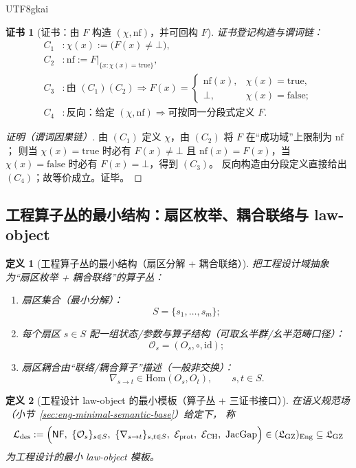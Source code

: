 \documentclass[12pt]{article}
\newtheorem{definition}{定义}[section]
\newtheorem{Certificate}{证书}[section]
\newcommand{\GZLS}{\ensuremath{\mathfrak{L}_{\mathrm{GZ}}}}
\newcommand{\JacGap}{\ensuremath{\mathrm{JacGap}}} %
\begin{document}
\begin{CJK*}{UTF8}{gkai}
\begin{Certificate}[证书：由 $F$ 构造 $(\chi,\mathrm{nf})$，并可回构 $F$]
\label{cert:eng-minimal-f-equivalence}
证书登记构造与谓词链：
\[
\begin{aligned}
  C_1 &: \chi(x):=\bigl(F(x)\neq\bot\bigr),\\
  C_2 &: \mathrm{nf}:=\left.F\right|_{\{x:\chi(x)=\mathrm{true}\}},\\
  C_3 &: \text{由 }(C_1)(C_2)\Rightarrow
  F(x)=\begin{cases}\mathrm{nf}(x),&\chi(x)=\mathrm{true},\\ \bot,&\chi(x)=\mathrm{false};\end{cases}\\
  C_4 &: \text{反向：给定 }(\chi,\mathrm{nf})\Rightarrow \text{可按同一分段式定义 }F.
\end{aligned}
\]
\end{Certificate}

\begin{proof}[证明（谓词因果链）]
由 $(C_1)$ 定义 $\chi$，由 $(C_2)$ 将 $F$ 在“成功域”上限制为 $\mathrm{nf}$；
则当 $\chi(x)=\mathrm{true}$ 时必有 $F(x)\neq\bot$ 且 $\mathrm{nf}(x)=F(x)$，当 $\chi(x)=\mathrm{false}$ 时必有 $F(x)=\bot$，得到
  $(C_3)$。
反向构造由分段定义直接给出 $(C_4)$；故等价成立。证毕。
\end{proof}

\subsection{工程算子丛的最小结构：扇区枚举、耦合联络与 law-object}
\label{sec:eng-minimal-operator-bundle}

\begin{definition}[工程算子丛的最小结构（扇区分解 + 耦合联络）]
\label{def:eng-minimal-operator-bundle}
把工程设计域抽象为“扇区枚举 + 耦合联络”的算子丛：
\begin{enumerate}
  \item 扇区集合（最小分解）：
  \[
    S=\{s_1,\dots,s_m\};
  \]
  \item 每个扇区 $s\in S$ 配一组状态/参数与算子结构（可取幺半群/幺半范畴口径）：
  \[
    \mathcal{O}_s=(O_s,\circ,\mathrm{id});
  \]
  \item 扇区耦合由“联络/耦合算子”描述（一般非交换）：
  \[
    \nabla_{s\to t}\in \mathrm{Hom}(O_s,O_t),\qquad s,t\in S.
  \]
\end{enumerate}
\end{definition}

\begin{definition}[工程设计 law-object 的最小模板（算子丛 + 三证书接口）]
\label{def:eng-minimal-law-object-template}
在语义规范场（小节~\ref{sec:eng-minimal-semantic-base}）给定下，
称
\[
  \mathcal{L}_{\mathrm{des}}
  :=
  \Bigl(
  \mathsf{NF},\ \{\mathcal{O}_s\}_{s\in S},\ \{\nabla_{s\to t}\}_{s,t\in S},\
  \mathcal{E}_{\mathrm{prot}},\ \mathcal{E}_{\mathrm{CH}},\ \JacGap
  \Bigr)\in(\GZLS)_{\mathrm{Eng}}\subseteq \GZLS
\]
为工程设计的最小 law-object 模板。
\end{definition}


\end{CJK*}
\end{document}
